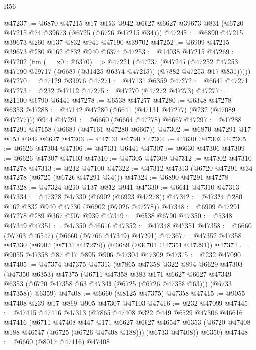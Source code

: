 \begin{lexlean}{R56}
\begin{coremodule}
@47237 := @6870
    @47215
    @17
    @153
    @942
    @6627
    @6627
    @39673
    @831
    (@6720 @47215 @34 @39673 (@6725 (@6726 @47215 @34)))
@47245 := @6890 @47215 @39673 @260 @137 @832 @941 @47190 @39702
@47252 := @6909 @47215 @39673 @280 @162 @832 @940 @6374
@47253 := @14038 @47215
@47269 := @47202
    (fun (__x0 : @6370) =>
    @47221
      (@47237
        (@47245
          (@47252 @47253 @47190 @39717 (@6689 (@31425 @6374 @47215)) (@7882 @47253 @17 @831)))))
@47270 := @47129 @39976
@47271 := @47131 @6359
@47272 := @6641 @47271
@47273 := @232 @47112
@47275 := @47270 (@47272 @47273)
@47277 := @21100 @6790 @6441
@47278 := @6538 @47277
@47280 := @6348 @47278 @6353
@47288 := @47142 @47280 (@6641 (@47131 @47277) (@232 (@47089 @47277))) @944
@47291 := @6660 (@6664 @47278) @6667
@47297 := @47288 @47291 @47158 (@6689 (@47161 @47280 @6667))
@47302 := @6870 @47291 @17 @153 @942 @6627
@47303 := @47131 @6790
@47304 := @6630 @47303
@47305 := @6626 @47304
@47306 := @47131 @6441
@47307 := @6630 @47306
@47309 := @6626 @47307 @47103
@47310 := @47305 @47309
@47312 := @47302 @47310 @47278
@47313 := @232 @47100
@47322 := @47312 @47313 (@6720 @47291 @34 @47278 (@6725 (@6726 @47291 @34)))
@47324 := @6890 @47291 @47278
@47328 := @47324 @260 @137 @832 @941
@47330 := @6641 @47310 @47313
@47334 := @47328 @47330 (@6902 (@6923 @47278))
@47342 := @47324 @280 @162 @832 @940 @47330 (@6902 (@7026 @47278))
@47348 := @6909 @47291 @47278 @289 @367 @907 @939
@47349 := @6538 @6790
@47350 := @6348 @47349
@47351 := @47350 @46616
@47352 := @47348 @47351
@47358 := @6660 (@7763 @46547) (@6660 (@7766 @47349) @47291)
@47367 := @47352 @47358 @47330 (@6902 (@7131 @47278)) (@6689 (@30701 @47351 @47291))
@47374 := @9055 @47358 @87 @17 @895 @906 @47304 @47309
@47375 := @232 @47090
@47405 := @47374
    @47375
    @47313
    (@7865
      @47358
      @322
      @894
      @6629
      @47303
      (@47350 @6353)
      @47375
      (@6711
        @47358
        @383
        @171
        @6627
        @6627
        @47349
        @6353
        (@6720 @47358 @63 @47349 (@6725 (@6726 @47358 @63)))
        (@6733 @47358))
      @6359)
@47408 := @6660 (@8125 @47375) @47358
@47415 := @9055 @47408 @239 @17 @899 @905 @47307 @47103
@47416 := @232 @47099
@47445 := @47415
    @47416
    @47313
    (@7865
      @47408
      @322
      @449
      @6629
      @47306
      @46616
      @47416
      (@6711
        @47408
        @447
        @171
        @6627
        @6627
        @46547
        @6353
        (@6720 @47408 @188 @46547 (@6725 (@6726 @47408 @188)))
        (@6733 @47408))
      @6350)
@47448 := @6660 (@8017 @47416) @47408

\end{coremodule}
\end{lexlean}
